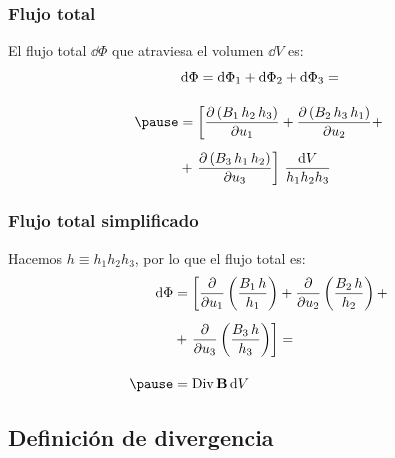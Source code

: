 \documentclass[12pt]{beamer}
\begin{document}
\begin{frame}
\frametitle{Flujo total}
El flujo total $\dd{\Phi}$ que atraviesa el volumen $\dd{V}$ es:
\pause
\begin{eqnarray*}
&\dd{\Phi} = \dd{\Phi_{1}} + \dd{\Phi_{2}} + \dd{\Phi_{3}} = \\[1em] \pause
&= \left[ \displaystyle \pdv{\left( B_{1} \, h_{2} \, h_{3} \right)}{u_{1}} + \pdv{\left( B_{2} \, h_{3} \, h_{1} \right)}{u_{2}} + \right. \\[0.5em] 
&+ \left. \displaystyle \pdv{\left( B_{3} \, h_{1} \, h_{2} \right)}{u_{3}} \right] \, \dfrac{\dd{V}}{h_{1} h_{2} h_{3}}
\end{eqnarray*}
\end{frame}
\begin{frame}
\frametitle{Flujo total simplificado}
Hacemos $h \equiv h_{1} h_{2} h_{3}$, por lo que el flujo total es:
\pause
\begin{eqnarray*}
\begin{aligned}
\dd{\Phi} &= \left[ \displaystyle \pdv{u_{1}} \left( \dfrac{B_{1} \, h}{h_{1}} \right) + \pdv{u_{2}} \left( \dfrac{B_{2} \, h}{h_{2}} \right) + \right. \\[0.5em]
&+ \left. \displaystyle \pdv{u_{3}} \left( \dfrac{B_{3} \, h}{h_{3}} \right) \right] = \\[1em] \pause
&= {\rm Div} \, \vb{B} \dd{V}
\end{aligned}
\end{eqnarray*}
\end{frame}

\subsection{Definición de divergencia}
\end{document}
